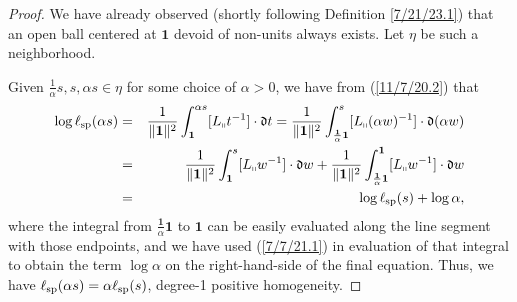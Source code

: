 \documentclass{amsart}
\numberwithin{equation}{section}
\theoremstyle{definition}
\numberwithin{theorem}{section}
\begin{document}
\begin{proof} We have already observed (shortly following Definition \ref{7/21/23.1}) that an open ball centered at $\mathbf{1}$ devoid of non-units always exists.  Let $\eta$  be such a neighborhood.

Given $\frac{1}{\alpha}s,s,\alpha s\in\eta$ for some choice of $\alpha>0$, we have from (\ref{11/7/20.2}) that
\begin{eqnarray}\nonumber  \log\ell_{\rm sp}(\alpha s) &=&  \frac{1}{\|{\bf 1}\|^2}\int_{\bf 1}^{\alpha s} [L_{\shortparallel}t^{-1}]\cdot \mathfrak{d}t = \frac{1}{\|{\bf 1}\|^2}\int_{\frac{\mathbf{1}}{\alpha}\mathbf{1}}^{s} [L_{\shortparallel}(\alpha w)^{-1}]\cdot \mathfrak{d}(\alpha w)  \\ \nonumber &=&  \frac{1}{\|{\bf 1}\|^2}\int_{\mathbf{1}}^{s} [L_{\shortparallel}w^{-1}]\cdot \mathfrak{d}w + \frac{1}{\|{\bf 1}\|^2}\int_{\frac{\mathbf{1}}{\alpha} \mathbf{1}}^{\mathbf{1}} [L_{\shortparallel}w^{-1}]\cdot \mathfrak{d}w  \\ &=& \log \ell_{\rm sp}(s) + \log\alpha, \label{4/2/23.1}
\end{eqnarray} where the integral from $\frac{\mathbf{1}}{\alpha} \mathbf{1}$ to $\mathbf{1}$ can be easily evaluated along the line segment with those endpoints, and we have used (\ref{7/7/21.1}) in evaluation of that integral to  obtain the term $\log \alpha$ on the right-hand-side of the final equation.  Thus, we have $\ell_{\rm sp}(\alpha s) = \alpha\ell_{\rm sp}(s)$, degree-1 positive homogeneity.


\end{proof}
\end{document}
